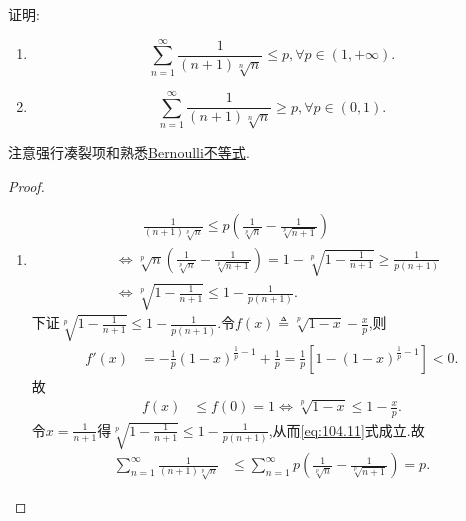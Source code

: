 \documentclass[../../main.tex]{subfiles}
\begin{document}
\begin{example}
证明:
\begin{enumerate}
\item $$\sum_{n=1}^\infty \frac{1}{(n+1)\sqrt[n]{n}} \leqslant p,\forall p \in (1,+\infty).$$

\item $$\sum_{n=1}^\infty \frac{1}{(n+1)\sqrt[n]{n}} \geqslant p,\forall p \in (0,1).$$
\end{enumerate}
\end{example}
\begin{note}
注意强行凑裂项和熟悉\hyperref[theorem:Bernoulli不等式]{Bernoulli不等式}.
\end{note}
\begin{proof}
\begin{enumerate}
\item \begin{align}
&\quad \quad \frac{1}{\left( n+1 \right) \sqrt[p]{n}}\leqslant p\left( \frac{1}{\sqrt[p]{n}}-\frac{1}{\sqrt[p]{n+1}} \right) \label{eq:104.11} \\
&\Longleftrightarrow \sqrt[p]{n}\left( \frac{1}{\sqrt[p]{n}}-\frac{1}{\sqrt[p]{n+1}} \right) =1-\sqrt[p]{1-\frac{1}{n+1}}\geqslant \frac{1}{p\left( n+1 \right)} \nonumber \\
&\Longleftrightarrow \sqrt[p]{1-\frac{1}{n+1}}\leqslant 1-\frac{1}{p\left( n+1 \right)}.\nonumber
\end{align}
下证$\sqrt[p]{1-\frac{1}{n+1}}\leqslant 1-\frac{1}{p\left( n+1 \right)}$.令$f\left( x \right) \triangleq \sqrt[p]{1-x}-\frac{x}{p}$,则
\begin{align*}
f\prime \left( x \right) &=-\frac{1}{p}\left( 1-x \right) ^{\frac{1}{p}-1}+\frac{1}{p}=\frac{1}{p}\left[ 1-\left( 1-x \right) ^{\frac{1}{p}-1} \right] <0.
\end{align*}
故
\begin{align*}
f\left( x \right) &\leqslant f\left( 0 \right) =1\Longleftrightarrow \sqrt[p]{1-x}\leqslant 1-\frac{x}{p}.
\end{align*}
令$x=\frac{1}{n+1}$得$\sqrt[p]{1-\frac{1}{n+1}}\leqslant 1-\frac{1}{p\left( n+1 \right)}$,从而\eqref{eq:104.11}式成立.故
\begin{align*}
\sum_{n=1}^{\infty}{\frac{1}{\left( n+1 \right) \sqrt[p]{n}}}&\leqslant \sum_{n=1}^{\infty}{p\left( \frac{1}{\sqrt[p]{n}}-\frac{1}{\sqrt[p]{n+1}} \right)}=p.
\end{align*}


\end{enumerate}
\end{proof}
\end{document}

